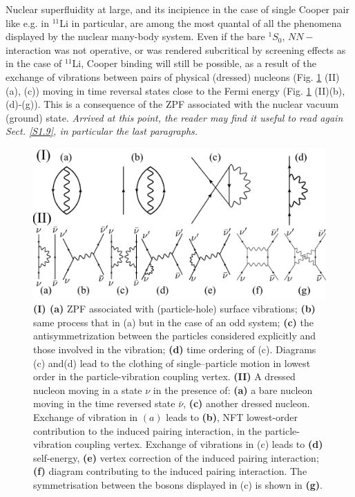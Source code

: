 \begin{subappendices}
Nuclear superfluidity at large, and its incipience in the case of single Cooper pair like e.g. in $^{11}$Li in particular, are among the most quantal of all  the phenomena displayed by the nuclear many-body 
system. Even if the bare $^1S_0$, $NN-$interaction was not operative, or was rendered subcritical by screening effects as in the case of $^{11}$Li, Cooper binding will still be possible, as a result of the exchange of vibrations between pairs of physical (dressed) nucleons (Fig. \ref{fig6G1} (II) (a), (c)) moving in time reversal states close to the Fermi energy (Fig. \ref{fig6G1} (II)(b),(d)-(g)). This is a
consequence of the ZPF associated with the  nuclear vacuum (ground) state. \textit{Arrived at this point, the reader may find it useful to read again Sect. \ref{S1.9}, in particular the last paragraphs.}
\begin{figure}
\centerline{\includegraphics[width=\textwidth]{C8/figsC8/fig6G1.pdf}}
\caption{{\bf (I) (a)} ZPF associated with (particle-hole) surface vibrations; 
{\bf (b)} same process that in (a) but in the case of an odd system; {\bf (c)} the antisymmetrization between the particles  considered explicitly and 
those involved in the vibration; {\bf (d)} time ordering of (c). 
Diagrams (c) and(d) lead to the clothing of single--particle motion  in lowest order in the 
particle-vibration coupling vertex.
{\bf (II)} A dressed  nucleon moving in a state $\nu$ in the presence of: {\bf (a)} a bare nucleon
moving in the time reversed state $\bar \nu$,
{\bf (c)} another dressed nucleon. Exchange of vibration in $(a)$ leads to {\bf (b)},  NFT 
lowest-order contribution to the induced pairing interaction, in the particle-vibration coupling vertex. Exchange 
of vibrations in {(c)}  leads to  {\bf (d)} self-energy, {\bf (e)} vertex correction of the  
induced pairing interaction;  {\bf (f)}  diagram contributing to the induced pairing interaction.
The symmetrisation between the bosons displayed in (c) is shown in {\bf (g)}.}\label{fig6G1}
\end{figure}


\end{subappendices}
